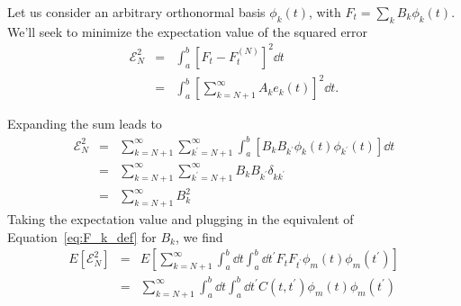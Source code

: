 Let us consider an arbitrary orthonormal basis
$\phi_k(t)$, with $F_t = \sum_k B_k\phi_k(t)$.  We'll seek to minimize
the expectation value of the squared error
\begin{eqnarray}
  \mathcal{E}^2_N &=& \int_a^b \left[F_t - F_t^{(N)}\right]^2 \dd t
  \nonumber\\
  &=& \int_a^b \left[\sum_{k = N + 1}^\infty A_k e_k(t)\right]^2 \dd t.
\end{eqnarray}

Expanding the sum leads to
\begin{eqnarray}
  \mathcal{E}^2_N &=& \sum_{k=N + 1}^\infty
  \sum_{k^\prime=N + 1}^\infty \int_a^b 
  \left[B_k B_{k^\prime} \phi_k(t) \phi_{k^\prime}(t)\right] \dd t
  \nonumber\\
  &=& \sum_{k=N+1}^\infty \sum_{k^\prime=N+1}^\infty B_k B_{k^\prime}
  \delta_{kk^\prime}\nonumber\\
  &=& \sum_{k=N+1}^\infty B_k^2
\end{eqnarray}
Taking the expectation value and plugging in the equivalent of
Equation~\ref{eq:F_k_def} for $B_k$, we find
\begin{eqnarray}
  E[\mathcal{E}^2_N] &=&
  E\left[\sum_{k=N+1}^\infty \int_a^b \dd t \int_a^b \dd t^\prime
  F_tF_{t^\prime} \phi_m(t)\phi_m(t^\prime)\right] \nonumber\\
  &=& \sum_{k=N+1}^\infty \int_a^b \dd t \int_a^b \dd t^\prime
  C(t, t^\prime) \phi_m(t)\phi_m(t^\prime)
\end{eqnarray}

